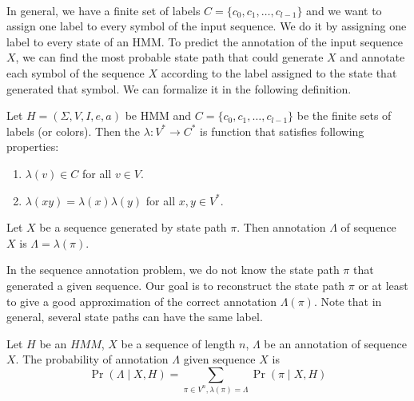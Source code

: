 \paragraph{} In general,
we have a finite set of labels $C=\{c_0,c_1,\dots,c_{l-1}\}$ and we want to
assign one label to every symbol of the input sequence. We do it by assigning
one label to every state of an HMM.
To predict the annotation of the input sequence $X$, we can  find the
most probable state path that could generate $X$ and  annotate each symbol of
the sequence $X$ according to the label assigned to the state that generated that
symbol. We can formalize it in the following definition.

\begin{definition}\label{DEFINITION:ANNOTATION}
Let $H=(\Sigma,V,I,e,a)$ be HMM and $C=\{c_0,c_1,\dots,c_{l-1}\}$ be the finite
sets of labels (or colors). Then the  
$\lambda: V^*\to C^*$ is function that satisfies following properties:
\begin{enumerate}
\item $\lambda(v)\in C$ for all $v\in V$.
\item $\lambda(xy) = \lambda(x)\lambda(y)$ for all $x,y\in V^*$.
\end{enumerate}

Let $X$ be a sequence generated by state path $\pi$. Then annotation
$\Lambda$ of sequence $X$ is $\Lambda = \lambda(\pi)$.
\end{definition}

In the sequence annotation problem, we do not know the state path $\pi$ that
generated a given sequence. Our goal is to reconstruct the state path $\pi$ or
at least to give a good approximation of the correct annotation $\Lambda(\pi)$.
Note that in general, several state paths can have the same label.


\begin{definition}
Let $H$ be an $HMM$, $X$ be a sequence of length $n$, $\Lambda$ be an annotation of sequence
$X$. The probability of annotation $\Lambda$ given sequence $X$ is 
\begin{equation}
\Pr\left(\Lambda\mid X,H\right)=\sum_{\pi \in V^n,\lambda(\pi) =
\Lambda}\Pr\left(\pi\mid X,H \right)\label{DEF:ANNOTATION:PROBABILITY}
\end{equation}
\end{definition}

